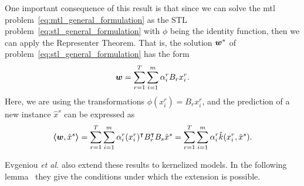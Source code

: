 One important consequence of this result is that since we can solve the \acrshort{mtl} problem~\eqref{eq:mtl_general_formulation} as the STL problem~\eqref{eq:stl_general_formulation} with $\phi$ being the identity function, then we can apply the {Representer Theorem}. That is, the solution ${\bm{w}}^*$ of problem~\eqref{eq:stl_general_formulation} has the form
\begin{equation}
    \nonumber
    \bm{w} = \sum_{r=1}^T \sum_{i=1}^m \alpha_i^r B_r x_i^r .
\end{equation}
Here, we are using the transformations $\phi(x_i^r) = B_r x_i^r$, and the prediction of a new instance $\hat{x}^s$ can be expressed as
\begin{equation}
    \nonumber
    \bm{\left\langle} \bm{w}, \hat{x}^s \bm{\right\rangle} = \sum_{r=1}^T \sum_{i=1}^m \alpha_i^r  (x_i^r)^\intercal B_r^\intercal B_s \hat{x}^s = \sum_{r=1}^T \sum_{i=1}^m \alpha_i^r  \hat{k}(x_i^r, \hat{x}^s).
\end{equation}

Evgeniou \emph{et al.} also extend these results to kernelized models. In the following lemma~\cite[Lemma 2]{EvgeniouMP05} they give the conditions under which the extension is possible.

